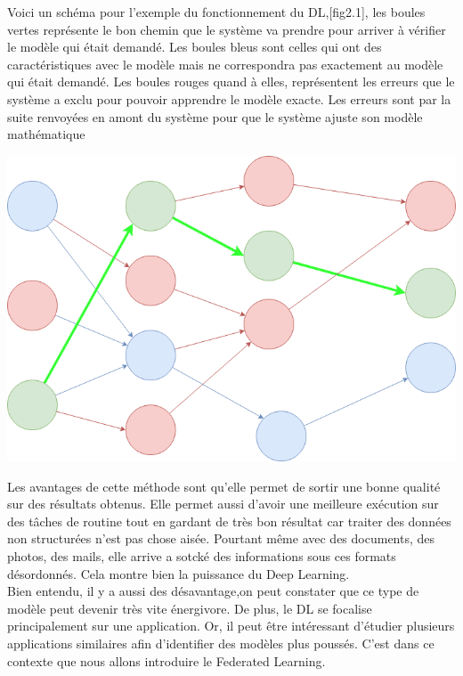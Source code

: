\documentclass[12pt,a4paper]{report}
\begin{document}
Voici un schéma pour l'exemple du fonctionnement du DL,[fig2.1], les boules vertes représente le bon chemin que le système va prendre pour arriver à vérifier le modèle qui était demandé. Les boules bleus sont celles qui ont des caractéristiques avec le modèle mais ne correspondra pas exactement au modèle qui était demandé. Les boules rouges quand à elles, représentent les erreurs que le système a exclu pour pouvoir apprendre le modèle exacte. Les erreurs sont par la suite renvoyées en amont du système pour que le système ajuste son modèle mathématique

\begin{center}
	\includegraphics[scale=0.4]{deep_learning_schema}
	\label{fig1}
\end{center}

Les avantages de cette méthode sont qu'elle permet de sortir une bonne qualité sur des résultats obtenus. Elle permet aussi d'avoir une meilleure exécution sur des tâches de routine tout en gardant de très bon résultat car traiter des données non structurées n'est pas chose aisée. Pourtant même avec des documents, des photos, des mails, elle arrive a sotcké des informations sous ces formats désordonnés. Cela montre bien la puissance du Deep Learning.\\

Bien entendu, il y a aussi des désavantage,on peut constater que ce type de modèle peut devenir très vite énergivore. De plus, le DL se focalise principalement sur une application. Or, il peut être intéressant d'étudier plusieurs applications similaires afin d'identifier des modèles plus poussés. C'est dans ce contexte que nous allons introduire le Federated Learning.
\end{document}
